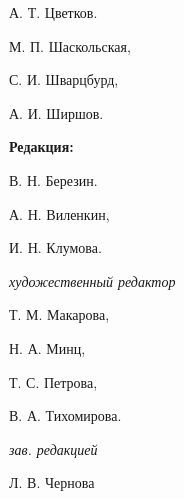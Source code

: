 \begin{minipage}{0.25\linewidth}
	А. Т. Цветков.
	
	М. П. Шаскольская,
	
	С. И. Шварцбурд,
	
	А. И. Ширшов.\vspace{0.5cm}
	
	\textbf{Редакция:}
	
	В. Н. Березин.
	
	А. Н. Виленкин,
	
	И. Н. Клумова.\vspace{0.1cm}
	
	\textit{художественный редактор}
	
	Т. М. Макарова,
	
	Н. А. Минц,
	
	Т. С. Петрова,
	
	В. А. Тихомирова.\vspace{0.1cm}
	
	\textit{зав. редакцией}
	
	Л. В. Чернова
\end{minipage}
\hfill
\vline
\hfill
